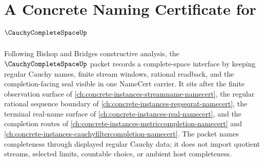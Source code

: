 \chapter{A Concrete Naming Certificate for $\CauchyCompleteSpaceUp$}
\label{ch:concrete-instances-cauchy-complete-space-namecert}

Following Bishop and Bridges constructive analysis, the $\CauchyCompleteSpaceUp$ packet records a complete-space interface by keeping regular Cauchy names, finite stream windows, rational readback, and the completion-facing seal visible in one NameCert carrier. It sits after the finite observation surface of \autoref{ch:concrete-instances-streamname-namecert}, the regular rational sequence boundary of \autoref{ch:concrete-instances-regseqrat-namecert}, the terminal real-name surface of \autoref{ch:concrete-instances-real-namecert}, and the completion routes of \autoref{ch:concrete-instances-metriccompletion-namecert} and \autoref{ch:concrete-instances-cauchyfiltercompletion-namecert}. The packet names completeness through displayed regular Cauchy data; it does not import quotient streams, selected limits, countable choice, or ambient host completeness.

